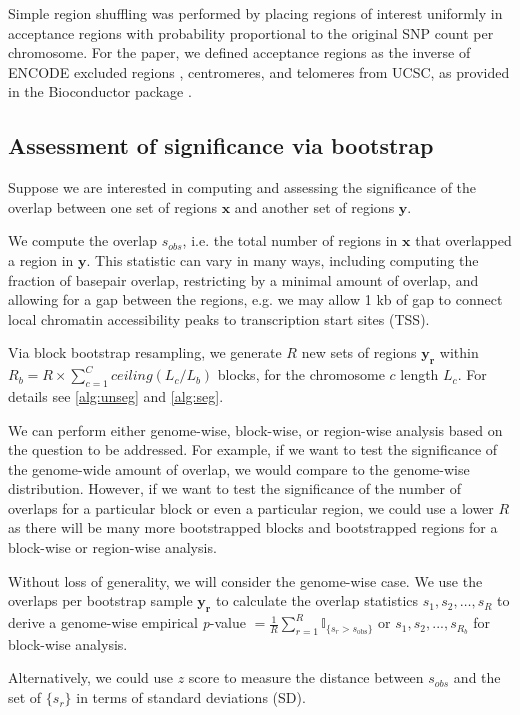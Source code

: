 \documentclass{article}
\begin{document}
Simple region shuffling was performed by placing regions of interest
uniformly in acceptance regions with probability proportional to the
original SNP count per chromosome. For the paper, we defined
acceptance regions as the inverse of
ENCODE excluded regions \citep{amemiya2019encode},
centromeres, and telomeres from UCSC,
as provided in the  Bioconductor package
\citep{excluderanges}.

\subsection{Assessment of significance via bootstrap}

Suppose we are interested in computing and assessing the significance
of the overlap between one set of regions
$\bm{x}$ and another set of regions $\bm{y}$.

We compute the overlap $s_{obs}$, i.e. the total number of 
regions in $\bm{x}$ that overlapped a region in $\bm{y}$.
This statistic can vary in many ways, including computing the fraction of
basepair overlap, restricting by a minimal amount of overlap, and
allowing for a gap between the regions, e.g. we may allow 1 kb of gap
to connect local chromatin accessibility peaks to transcription start
sites (TSS).

Via block bootstrap resampling, we generate $R$ new
sets of regions $\bm{y_r}$ within $R_b = R \times \sum_{c=1}^{C} ceiling(L_c / L_b)$ blocks, for the chromosome $c$ length $L_c$.
For details see \cref{alg:unseg} and \cref{alg:seg}.

We can perform either genome-wise, block-wise, or region-wise analysis
based on the question to be addressed. For example, if we want to test
the significance of the genome-wide amount of overlap, we would compare
to the genome-wise distribution. However, if we want to
test the significance of the number of overlaps for a particular
block or even a particular region, we could use a lower $R$ as there
will be many more bootstrapped blocks and bootstrapped regions for a
block-wise or region-wise analysis.

Without loss of generality, we will consider the genome-wise case.
We use the overlaps per bootstrap sample $\bm{y_r}$ to calculate the
overlap statistics $s_{1}, s_{2}, \dots, s_{R}$
to derive a genome-wise empirical \textit{p}-value
$= \frac{1}{R} \sum_{r=1}^R \mathbb{I}_{\{s_r > s_\text{obs}\}}$ or
$s_{1}, s_{2},..., s_{R_b}$ for block-wise analysis.

Alternatively, we could use $z$ score to measure the
distance between $s_{obs}$ and the
set of $\{s_r\}$ in terms of standard deviations (SD).
\end{document}
